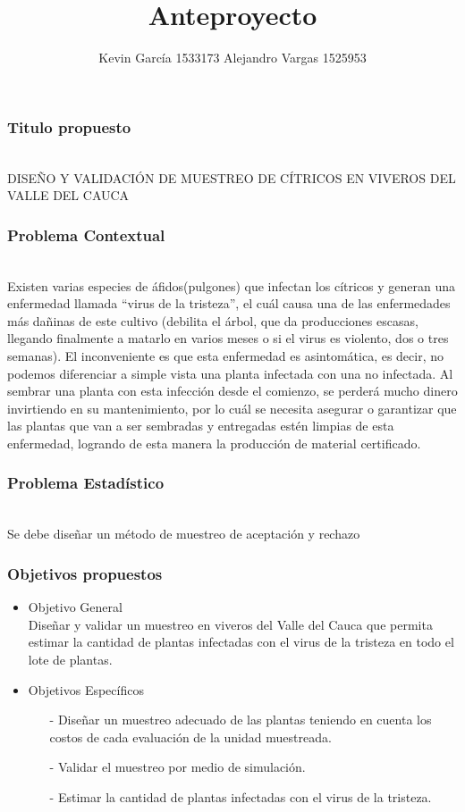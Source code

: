 \documentclass[12pt]{beamer}
\author[Kevin García - Alejandro Vargas]{Kevin García 1533173 \newline Alejandro Vargas 1525953}
\title[Anteproyecto]{Anteproyecto}
\begin{document}
\justify
\begin{frame}
\titlepage
\end{frame}

\begin{frame}
\frametitle{Titulo propuesto}
\begin{center}
~\\ DISEÑO Y VALIDACIÓN DE MUESTREO DE CÍTRICOS EN VIVEROS DEL VALLE DEL CAUCA
\end{center}
\end{frame}

\begin{frame}
\frametitle{Problema Contextual}
~\\Existen varias especies de áfidos(pulgones) que infectan los cítricos y generan una enfermedad llamada ``virus de la tristeza'', el cuál causa una de las enfermedades más dañinas de este cultivo (debilita el árbol, que da producciones escasas, llegando finalmente a matarlo en varios meses o si el virus es violento, dos o tres semanas). El inconveniente es que esta enfermedad es asintomática, es decir, no podemos diferenciar a simple vista una planta infectada con una no infectada. Al sembrar una planta con esta infección desde el comienzo, se perderá mucho dinero invirtiendo en su mantenimiento, por lo cuál se necesita asegurar o garantizar que las plantas que van a ser sembradas y entregadas estén limpias de esta enfermedad, logrando de esta manera la producción de material certificado.
\end{frame}

\begin{frame}
\frametitle{Problema Estadístico}
~\\Se debe diseñar un método de muestreo de aceptación y rechazo
\end{frame}

\begin{frame}
\frametitle{Objetivos propuestos}
\begin{itemize}
\item Objetivo General
~\\Diseñar y validar un muestreo en viveros del Valle del Cauca que permita estimar la cantidad de plantas infectadas con el virus de la tristeza en todo el lote de plantas.
\item Objetivos Específicos
\begin{itemize}
\item[-]Diseñar un muestreo adecuado de las plantas teniendo en cuenta los costos de cada evaluación de la unidad muestreada.
\item[-]Validar el muestreo por medio de simulación.
\item[-]Estimar la cantidad de plantas infectadas con el virus de la tristeza.
\end{itemize}
\end{itemize}
\end{frame}
\end{document}
